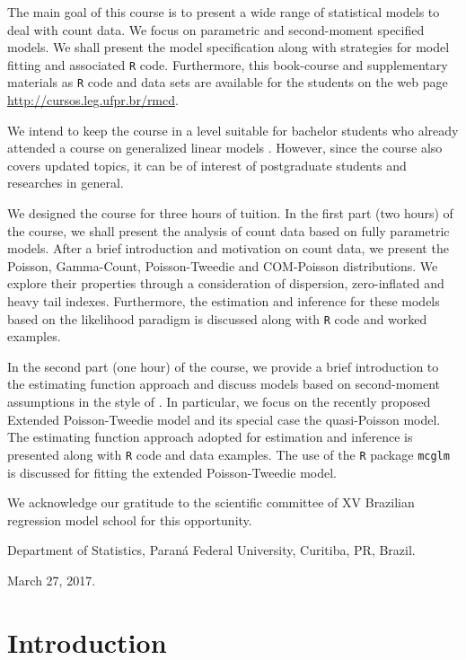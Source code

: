 \documentclass[9pt,a5paper,]{book}
\theoremstyle{definition}
\theoremstyle{definition}
\theoremstyle{remark}
\begin{document}
The main goal of this course is to present a wide range of statistical
models to deal with count data. We focus on parametric and second-moment
specified models. We shall present the model specification along with
strategies for model fitting and associated \texttt{R}\citep{R2015}
code. Furthermore, this book-course and supplementary materials as
\texttt{R} code and data sets are available for the students on the web
page \url{http://cursos.leg.ufpr.br/rmcd}.

We intend to keep the course in a level suitable for bachelor students
who already attended a course on generalized linear models
\citep{Nelder1972}. However, since the course also covers updated
topics, it can be of interest of postgraduate students and researches in
general.

We designed the course for three hours of tuition. In the first part
(two hours) of the course, we shall present the analysis of count data
based on fully parametric models. After a brief introduction and
motivation on count data, we present the Poisson, Gamma-Count,
Poisson-Tweedie and COM-Poisson distributions. We explore their
properties through a consideration of dispersion, zero-inflated and
heavy tail indexes. Furthermore, the estimation and inference for these
models based on the likelihood paradigm is discussed along with
\texttt{R} code and worked examples.

In the second part (one hour) of the course, we provide a brief
introduction to the estimating function approach \citetext{\citealp[
]{Jorgensen2004}; \citealp{Bonat2016a}} and discuss models based on
second-moment assumptions in the style of \citet{Wedderburn1974}. In
particular, we focus on the recently proposed Extended Poisson-Tweedie
model \citep{Bonat2016b} and its special case the quasi-Poisson model.
The estimating function approach adopted for estimation and inference is
presented along with \texttt{R} code and data examples. The use of the
\texttt{R} package \texttt{mcglm} \citep{Bonat2016c} is discussed for
fitting the extended Poisson-Tweedie model.

We acknowledge our gratitude to the scientific committee of XV Brazilian
regression model school for this opportunity.

Department of Statistics, Paraná Federal University, Curitiba, PR,
Brazil.

March 27, 2017.

\chapter{Introduction}\label{introduction}
\end{document}
